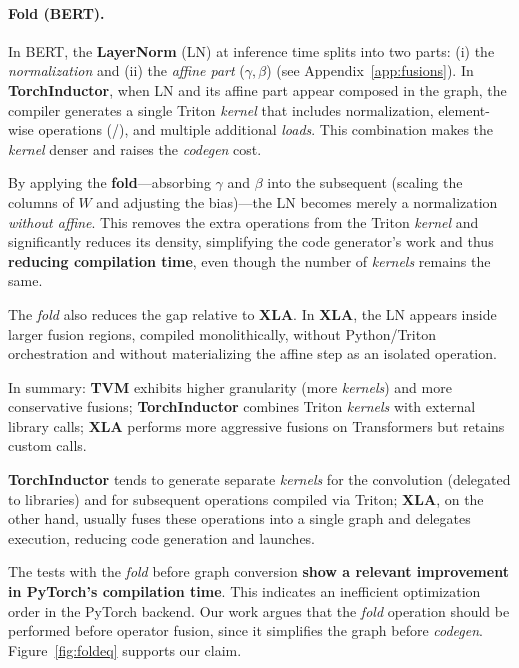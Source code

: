 \documentclass[sigconf,anonymous]{acmart}
\newcommand{\tcode}[1]{\texttt{\seqsplit{#1}}}
\begin{document}
\paragraph{Fold (BERT).}
In BERT, the \textbf{LayerNorm} (LN) at inference time splits into two parts: (i) the \emph{normalization} and (ii) the \emph{affine part} (\(\gamma,\beta\)) (see Appendix~\ref{app:fusions}). In \textbf{TorchInductor}, when LN and its affine part appear composed in the graph, the compiler generates a single Triton \emph{kernel} that includes normalization, element-wise operations (\tcode{mul}/\tcode{add}), and multiple additional \emph{loads}. This combination makes the \emph{kernel} denser and raises the \emph{codegen} cost.

By applying the \textbf{fold}---absorbing \(\gamma\) and \(\beta\) into the subsequent \tcode{Linear} (scaling the columns of \(W\) and adjusting the bias)---the LN becomes merely a normalization \emph{without affine}. This removes the extra operations from the Triton \emph{kernel} and significantly reduces its density, simplifying the code generator's work and thus \textbf{reducing compilation time}, even though the number of \emph{kernels} remains the same.

The \emph{fold} also reduces the gap relative to \textbf{XLA}. In \textbf{XLA}, the LN appears inside larger fusion regions, compiled monolithically, without Python/Triton orchestration and without materializing the affine step as an isolated operation.

In summary: \textbf{TVM} exhibits higher granularity (more \emph{kernels}) and more conservative fusions; \textbf{TorchInductor} combines Triton \emph{kernels} with external library calls; \textbf{XLA} performs more aggressive fusions on Transformers but retains custom calls.

\textbf{TorchInductor} tends to generate separate \emph{kernels} for the convolution (delegated to libraries) and for subsequent operations compiled via Triton; \textbf{XLA}, on the other hand, usually fuses these operations into a single graph and delegates execution, reducing code generation and launches.

The tests with the \textit{fold} before graph conversion \textbf{show a relevant improvement in PyTorch's compilation time}. This indicates an inefficient optimization order in the PyTorch backend. Our work argues that the \textit{fold} operation should be performed before operator fusion, since it simplifies the graph before \emph{codegen}. Figure~\ref{fig:foldeq} supports our claim.
\end{document}
